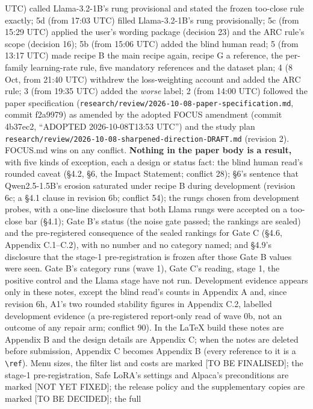 \documentclass{article}
\theoremstyle{plain}
\theoremstyle{definition}
\theoremstyle{remark}
\begin{document}
UTC) called Llama-3.2-1B's rung provisional and stated the frozen too-close rule
exactly; 5d (from 17:03 UTC) filled Llama-3.2-1B's rung provisionally; 5c (from
15:29 UTC) applied the user's wording package (decision 23) and the ARC rule's
scope (decision 16); 5b (from 15:06 UTC) added the blind human read; 5 (from
13:17 UTC) made recipe B the main recipe again, recipe G a reference, the
per-family learning-rate rule, five mandatory references and the dataset plan; 4
(8 Oct, from 21:40 UTC) withdrew the loss-weighting account and added the ARC
rule; 3 (from 19:35 UTC) added the \emph{worse} label; 2 (from 14:00 UTC)
followed the paper specification
(\nolinkurl{research/review/2026-10-08-paper-specification.md}, commit f2a9979)
as amended by the adopted FOCUS amendment (commit 4b37ec2, ``ADOPTED
2026-10-08T13:53 UTC'') and the study plan
\nolinkurl{research/review/2026-10-08-sharpened-direction-DRAFT.md} (revision
2). FOCUS.md wins on any conflict. \textbf{Nothing in the paper body is a
result,} with five kinds of exception, each a design or status fact: the blind
human read's rounded caveat (\S{}4.2, \S{}6, the Impact Statement; conflict 28);
\S{}6's sentence that Qwen2.5-1.5B's erosion saturated under recipe B during
development (revision 6c; a \S{}4.1 clause in revision 6b; conflict 54); the
rungs chosen from development probes, with a one-line disclosure that both Llama
rungs were accepted on a too-close bar (\S{}4.1); Gate B's status (the noise
gate passed; the rankings are sealed) and the pre-registered consequence of the
sealed rankings for Gate C (\S{}4.6, Appendix C.1--C.2), with no number and no
category named; and \S{}4.9's disclosure that the stage-1 pre-registration is
frozen after those Gate B values were seen. Gate B's category runs (wave 1),
Gate C's reading, stage 1, the positive control and the Llama stage have not
run. Development evidence appears only in these notes, except the blind read's
counts in Appendix A and, since revision 6h, A1's two rounded stability figures
in Appendix C.2, labelled development evidence (a pre-registered report-only
read of wave 0b, not an outcome of any repair arm; conflict 90). In the LaTeX
build these notes are Appendix B and the design details are Appendix C; when the
notes are deleted before submission, Appendix C becomes Appendix B (every
reference to it is a \texttt{\textbackslash{}ref}). Menu sizes, the filter list
and costs are marked [TO BE FINALISED]; the stage-1 pre-registration, Safe
LoRA's settings and Alpaca's preconditions are marked [NOT YET FIXED]; the
release policy and the supplementary copies are marked [TO BE DECIDED]; the full
\end{document}
